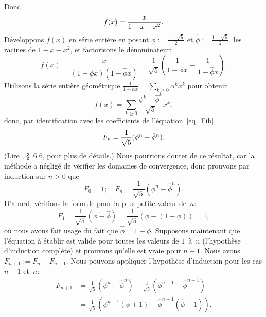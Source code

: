 Donc
\begin{equation*}
\abovedisplayskip=0pt
\abovedisplayshortskip=0pt
\belowdisplayskip=4pt
f(x) = \frac{x}{1 - x - x^2}.
\end{equation*}
Développons \(f(x)\) en série entière en posant \(\phi :=
\frac{1+\sqrt{5}}{2}\) et \(\hat\phi := \frac{1-\sqrt{5}}{2}\), les
racines de \(1 - x - x^2\), et factorisons le dénominateur:
\begin{equation*}
f(x) = \frac{x}{(1-\phi x)(1-\hat\phi x)}
     = \frac{1}{\sqrt{5}}\left(\frac{1}{1 - \phi x}
                              - \frac{1}{1 - \hat\phi x}\right).
\end{equation*}
Utilisons la série entière géométrique \(\frac{1}{1-\alpha x} =
\sum_{k \geqslant 0}{\alpha^kx^k}\) pour obtenir
\begin{equation*}
f(x) = \sum_{k \geqslant 0}{\frac{\phi^k-\hat\phi^k}{\sqrt{5}}}x^k,
\end{equation*}
donc, par identification avec les coefficients de
l'équation~\eqref{eq_Fib},
\begin{equation*}
\abovedisplayskip=4pt
\abovedisplayshortskip=4pt
\belowdisplayskip=4pt
F_n = \frac{1}{\sqrt{5}}(\phi^n - \hat\phi^n).
\end{equation*}
(Lire \cite{GrahamKnuthPatashnik_1994}, \S~6.6, pour plus de détails.)
Nous pourrions douter de ce résultat, car la méthode a négligé de
vérifier les domaines de convergence, donc
prouvons par induction sur \(n > 0\) que
\begin{equation*}
F_0 = 1;\quad F_n = \frac{1}{\sqrt{5}}(\phi^n - \hat\phi^n).
\end{equation*}
D'abord, vérifions la formule pour la plus petite valeur de~\(n\):
\begin{equation*}
F_1 = \frac{1}{\sqrt{5}}(\phi - \hat\phi)
   = \frac{1}{\sqrt{5}}(\phi - (1 - \phi)) = 1,
\end{equation*}
où nous avons fait usage du fait que \(\hat\phi = 1 -
\phi\). Supposons maintenant que l'équation à établir est valide pour
toutes les valeurs de \(1\)~à~\(n\) (l'hypothèse d'induction complète)
et prouvons qu'elle est vraie pour \(n+1\). Nous avons \( F_{n+1} :=
F_n + F_{n-1}\). Nous pouvons appliquer l'hypothèse d'induction pour
les cas \(n-1\) et~\(n\):
\begin{align*}
F_{n+1} &= \frac{1}{\sqrt{5}}(\phi^n - \hat\phi^n) +
          \frac{1}{\sqrt{5}}(\phi^{n-1} - \hat\phi^{n-1})\\
       &= \frac{1}{\sqrt{5}}(\phi^{n-1}(\phi + 1) -
          \hat\phi^{n-1}(\hat\phi + 1)).
\end{align*}
